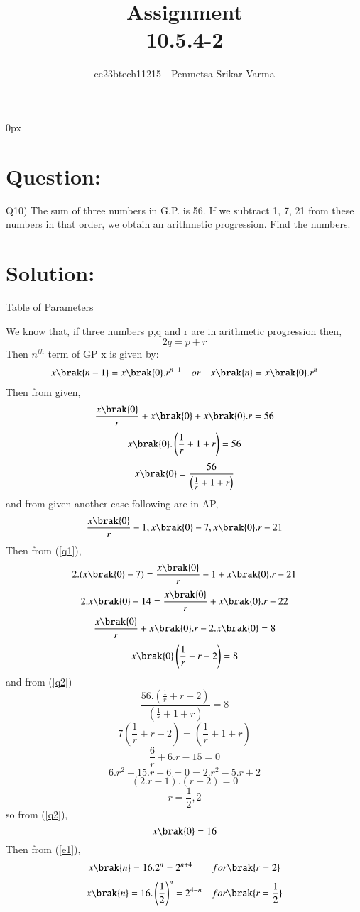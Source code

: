 \documentclass[beamer]{IEEEtran}
\theoremstyle{remark}
\begin{document}
\parindent 0px


\title{Assignment\\[1ex]10.5.4-2}
\author{ee23btech11215 - Penmetsa Srikar Varma$^{}$%
}
\maketitle
\newpage
\bigskip

\renewcommand{\thefigure}{\theenumi}
\renewcommand{\thetable}{\theenumi}
\section*{Question:}
Q10) The sum of three numbers in G.P. is 56. If we subtract 1, 7, 21 from these numbers in that order, we obtain an arithmetic progression. Find the numbers.
\section*{Solution:}
{\centering
Table of Parameters\\
}
\begin{table}[h]
    \centering
     
     \label{tab:t1}
\end{table}
We know that, if three numbers p,q and r are in arithmetic progression then,
\begin{equation}
\label{q1}
2q = p + r
\end{equation}
Then $n^{th}$ term of GP x is given by:\\
\begin{align}
\label{e1}
x\brak{n-1}=x\brak{0}.r^{n-1}\quad or\quad x\brak{n}=x\brak{0}.r^{n}
\end{align}
Then from given,
\[\frac{x\brak{0}}{r}+x\brak{0}+x\brak{0}.r=56\]
\[x\brak{0}.\left(\frac{1}{r}+1+r\right)=56\]
\begin{equation}
\label{q2}
x\brak{0}=\frac{56}{\left(\frac{1}{r}+1+r\right)}
\end{equation}
and from given another case following are in AP,
\[\frac{x\brak{0}}{r}-1,x\brak{0}-7,x\brak{0}.r-21\]
Then from (\ref{q1}),
\[2.(x\brak{0}-7)=\frac{x\brak{0}}{r}-1+x\brak{0}.r-21\]
\[2.x\brak{0}-14=\frac{x\brak{0}}{r}+x\brak{0}.r-22\]
\[\frac{x\brak{0}}{r}+x\brak{0}.r-2.x\brak{0}=8\]
\[x\brak{0}\left(\frac{1}{r}+r-2\right)=8\]
and from (\ref{q2})
\[\frac{56.\left(\frac{1}{r}+r-2\right)}{\left(\frac{1}{r}+1+r\right)}=8\]
\[7\left(\frac{1}{r}+r-2\right)=\left(\frac{1}{r}+1+r\right)\]
\[\frac{6}{r}+6.r-15=0\]
\[6.r^2-15.r+6=0=2.r^2-5.r+2\]
\[(2.r-1).(r-2)=0\]
\begin{equation}
\label{q3}
r=\frac{1}{2},2
\end{equation}
so from (\ref{q2}),
\[x\brak{0}=16\]
Then from (\ref{e1}),
\begin{align}
    \label{a11}
    x\brak{n}=16.2^{n}=2^{n+4}\qquad for \brak{r=2}
\end{align}
\begin{align}
    \label{a12}
    x\brak{n}=16.\left(\frac{1}{2}\right)^{n}=2^{4-n}\quad for \brak{r=\frac{1}{2}}
\end{align}\\\\
\end{document}
